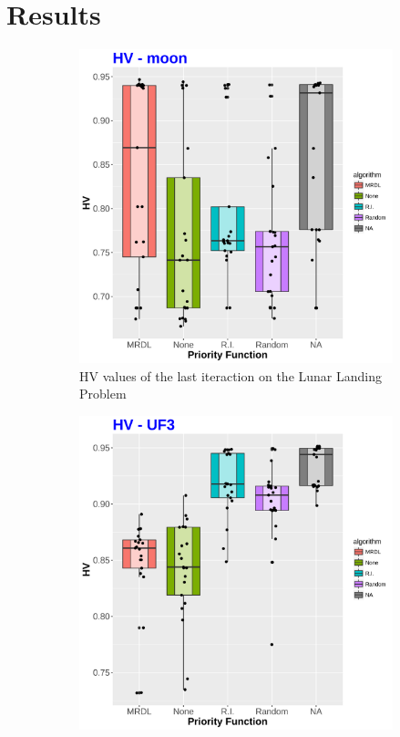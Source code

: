 \section{Results}


\begin{figure}[!t]

	\begin{subfigure}[b]{0.33\textwidth}
		\centering
		\includegraphics[width=1\textwidth, height=1\textwidth]{images/moon_HV}
		\caption{HV values of the last iteraction on the Lunar Landing Problem}
	\end{subfigure}
	\begin{subfigure}[b]{0.33\textwidth}
		\centering
	\includegraphics[width=1\textwidth, height=1\textwidth]{images/UF3_HV}

\end{subfigure}
\end{figure}
